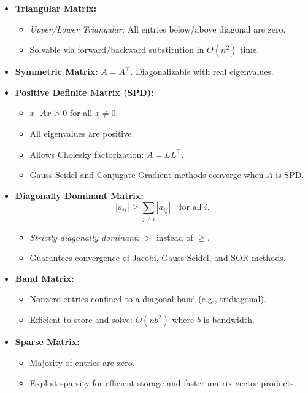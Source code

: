 \documentclass[9pt,letterpaper]{article}
\begin{document}
\begin{multicols*}{3}
\begin{itemize}
    \item \textbf{Triangular Matrix:}
      \begin{itemize}
        \item \textit{Upper/Lower Triangular:} All entries below/above diagonal are zero.
        \item Solvable via forward/backward substitution in $O(n^2)$ time.
      \end{itemize}

    \item \textbf{Symmetric Matrix:} $A = A^\top$. Diagonalizable with real eigenvalues.

    \item \textbf{Positive Definite Matrix (SPD):}
      \begin{itemize}
        \item $x^\top A x > 0$ for all $x \neq 0$.
        \item All eigenvalues are positive.
        \item Allows Cholesky factorization: $A = LL^\top$.
        \item Gauss-Seidel and Conjugate Gradient methods converge when $A$ is SPD.
      \end{itemize}

    \item \textbf{Diagonally Dominant Matrix:}
      \[
        |a_{ii}| \ge \sum_{j\ne i} |a_{ij}| \quad \text{for all } i.
      \]
      \begin{itemize}
        \item \textit{Strictly diagonally dominant:} $>$ instead of $\ge$.
        \item Guarantees convergence of Jacobi, Gauss-Seidel, and SOR methods.
      \end{itemize}

    \item \textbf{Band Matrix:}
      \begin{itemize}
        \item Nonzero entries confined to a diagonal band (e.g., tridiagonal).
        \item Efficient to store and solve: $O(nb^2)$ where $b$ is bandwidth.
      \end{itemize}

    \item \textbf{Sparse Matrix:}
      \begin{itemize}
        \item Majority of entries are zero.
        \item Exploit sparsity for efficient storage and faster matrix-vector products.
      \end{itemize}


\end{itemize}
\end{multicols*}
\end{document}
